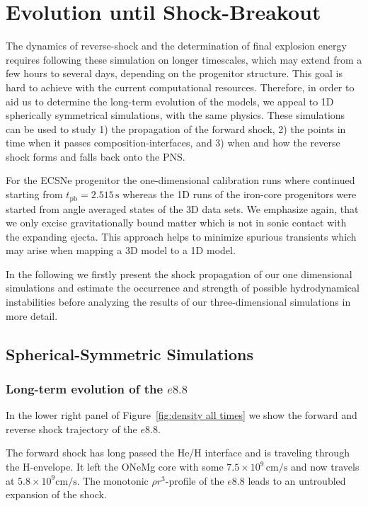 \documentclass[fleqn,usenatbib]{mnras}
\begin{document}
\section{Evolution until Shock-Breakout}
\label{sec:Evolution until Shock-Breakout}
The dynamics of reverse-shock and the determination of final explosion energy requires following these simulation on longer timescales, which may extend from a few hours to several days, depending on the progenitor structure. This goal is hard to achieve with the current computational resources. Therefore, in order to aid us to determine the long-term evolution of the models, we appeal to 1D spherically symmetrical simulations, with the same physics. These simulations can be used to study 1) the propagation of the forward shock, 2) the points in time when it passes composition-interfaces, and 3) when and how the reverse shock forms and falls back onto the PNS.

For the ECSNe progenitor the one-dimensional calibration runs where continued starting from $t_{\mathrm{pb}} = 2.515 \,\text{s}$ whereas the 1D runs of the iron-core progenitors were started from angle averaged states of the 3D data sets. We emphasize again, that we only excise gravitationally bound matter which is not in sonic contact with the expanding ejecta. This approach helps to minimize spurious transients which may arise when mapping a 3D model to a 1D model.

In the following we firstly present the shock propagation of our one dimensional simulations and estimate the occurrence and strength of possible hydrodynamical instabilities before analyzing the results of our three-dimensional simulations in more detail.

\subsection{Spherical-Symmetric Simulations}
\subsubsection{Long-term evolution of the $e8.8$}
\label{sec:Long-term evolution of the e8.8}

In the lower right panel of Figure~\ref{fig:density all times} we show the forward and reverse shock trajectory of the $e8.8$.

The forward shock has long passed the He/H interface and is traveling through the H-envelope. It left the ONeMg core with some $7.5\times 10^{9}\,\text{cm/s}$ and now travels at $5.8\times 10^{9}\mathrm{cm/s}$. The monotonic $\rho r^3$-profile of the $e8.8$ leads to an untroubled expansion of the shock.
\end{document}
